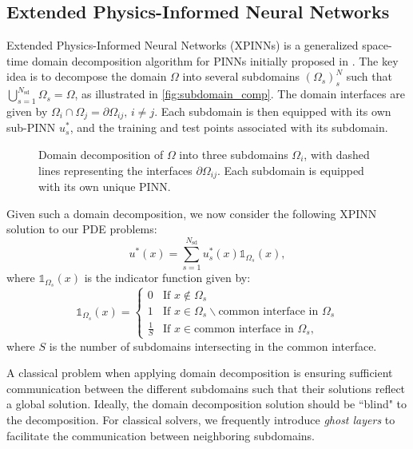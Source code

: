 \subsection{Extended Physics-Informed Neural Networks}
Extended Physics-Informed Neural Networks (XPINNs) is a generalized space-time domain decomposition algorithm for PINNs initially proposed in \textcite{Jagtap2020ExtendedPN}.
The key idea is to decompose the domain $\Omega$ into several subdomains $(\Omega_s)_s^N$ such that $\bigcup_{s=1}^{N_\mathrm{sd}}\Omega_s=\Omega$, as illustrated in \autoref{fig:subdomain_comp}.
The domain interfaces are given by $\Omega_i\cap \Omega_j = \partial\Omega_{ij},\, i\neq j$.
Each subdomain is then equipped with its own sub-PINN $u^*_s$, and the training and test points associated with its subdomain.

\begin{figure}[h]
\centering

\caption{Domain decomposition of $\Omega$ into three subdomains $\Omega_i$, with dashed lines representing the interfaces $\partial \Omega_{ij}$. Each subdomain is equipped with its own unique PINN. }
\label{fig:subdomain_comp}
\end{figure}

Given such a domain decomposition, we now consider the following XPINN solution to our PDE problems:
\begin{equation}\label{eq:XPINN}
    u^* (x)=\sum_{s=1}^{N_\mathrm{sd}} u_{s}^*(x) \mathds{1}_{\Omega_s}(x),
\end{equation}
where $\mathds{1}_{\Omega_s}(x)$ is the indicator function given by:
\begin{equation}
    \mathds{1}_{\Omega_s}(x)=
    \begin{cases}
        0 &\text{If } x \notin \Omega_s \\
        1 &\text{If } x \in \Omega_s \backslash \text{common interface in } \Omega_s \\
        \frac{1}{S} &\text{If } x \in \text{common interface in } \Omega_s,
    \end{cases}
\end{equation}
where $S$ is the number of subdomains intersecting in the common interface.

A classical problem when applying domain decomposition is ensuring sufficient communication between the different subdomains such that their solutions reflect a global solution.
Ideally, the domain decomposition solution should be ``blind" to the decomposition.
For classical solvers, we frequently introduce \textit{ghost layers} to facilitate the communication between neighboring subdomains. 

